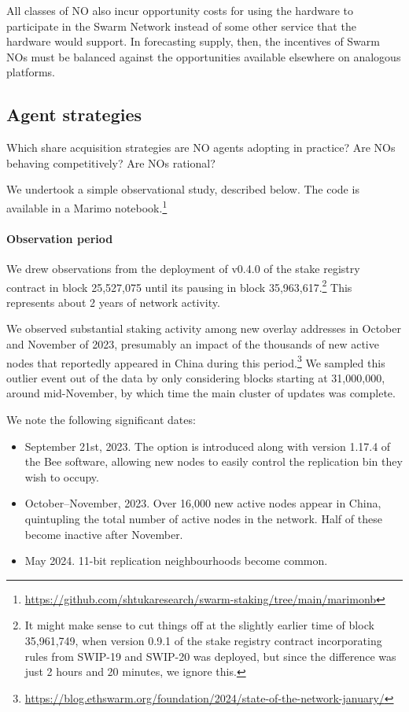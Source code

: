 \begin{remark}

  All classes of NO also incur opportunity costs for using the hardware to participate in the Swarm Network instead of some other service that the hardware would support.
  In forecasting supply, then, the incentives of Swarm NOs must be balanced against the opportunities available elsewhere on analogous platforms.

\end{remark}




\subsection{Agent strategies}
\label{section:strategies}

Which share acquisition strategies are NO agents adopting in practice?
%
Are NOs behaving competitively?
%
Are NOs rational?

We undertook a simple observational study, described below.
%
The code is available in a Marimo notebook.\footnote{\url{https://github.com/shtukaresearch/swarm-staking/tree/main/marimonb}}

\paragraph{Observation period}
We drew observations from the deployment of v0.4.0 of the stake registry contract in block 25,527,075 until its pausing in block 35,963,617.\footnote{It might make sense to cut things off at the slightly earlier time of block 35,961,749, when version 0.9.1 of the stake registry contract incorporating rules from SWIP-19 and SWIP-20 was deployed, but since the difference was just 2 hours and 20 minutes, we ignore this.} This represents about 2 years of network activity.

We observed substantial staking activity among new overlay addresses in October and November of 2023, presumably an impact of the thousands of new active nodes that reportedly appeared in China during this period.\footnote{\url{https://blog.ethswarm.org/foundation/2024/state-of-the-network-january/}}
%
We sampled this outlier event out of the data by only considering blocks starting at 31,000,000, around mid-November, by which time the main cluster of updates was complete.

We note the following significant dates:
\begin{itemize}
  \item September 21st, 2023. The  option is introduced along with version 1.17.4 of the Bee software, allowing new nodes to easily control the replication bin they wish to occupy.
  \item October--November, 2023. Over 16,000 new active nodes appear in China, quintupling the total number of active nodes in the network. Half of these become inactive after November.
  \item May 2024. 11-bit replication neighbourhoods become common.
\end{itemize}


